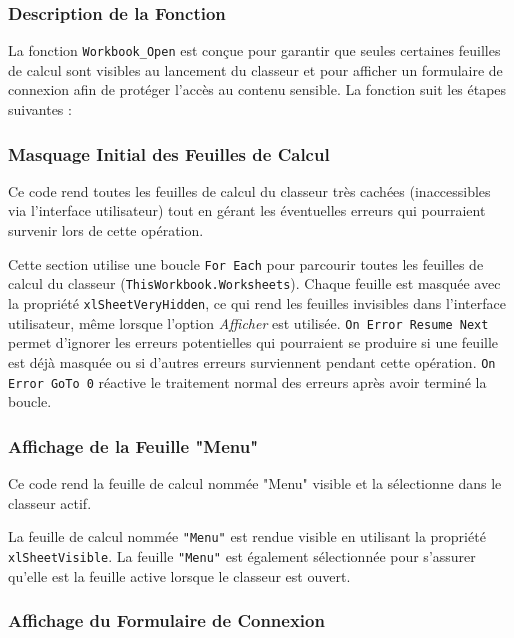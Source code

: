 \documentclass[a4paper, oneside, 12pt, final]{extreport}
\begin{document}
\subsubsection{Description de la Fonction}

La fonction \texttt{Workbook\_Open} est conçue pour garantir que seules certaines feuilles de calcul sont visibles au lancement du classeur et pour afficher un formulaire de connexion afin de protéger l'accès au contenu sensible. La fonction suit les étapes suivantes :

\subsubsection{Masquage Initial des Feuilles de Calcul}
Ce code rend toutes les feuilles de calcul du classeur très cachées (inaccessibles via l'interface utilisateur) tout en gérant les éventuelles erreurs qui pourraient survenir lors de cette opération.


Cette section utilise une boucle \texttt{For Each} pour parcourir toutes les feuilles de calcul du classeur (\texttt{ThisWorkbook.Worksheets}).
Chaque feuille est masquée avec la propriété \texttt{xlSheetVeryHidden}, ce qui rend les feuilles invisibles dans l'interface utilisateur, même lorsque l'option \textit{Afficher} est utilisée.
\texttt{On Error Resume Next} permet d'ignorer les erreurs potentielles qui pourraient se produire si une feuille est déjà masquée ou si d'autres erreurs surviennent pendant cette opération.
\texttt{On Error GoTo 0} réactive le traitement normal des erreurs après avoir terminé la boucle.

\subsubsection{Affichage de la Feuille "Menu"}

Ce code rend la feuille de calcul nommée "Menu" visible et la sélectionne dans le classeur actif.

La feuille de calcul nommée \texttt{"Menu"} est rendue visible en utilisant la propriété \texttt{xlSheetVisible}.
La feuille \texttt{"Menu"} est également sélectionnée pour s'assurer qu'elle est la feuille active lorsque le classeur est ouvert.

\subsubsection{Affichage du Formulaire de Connexion}
\end{document}
